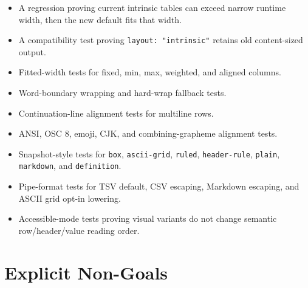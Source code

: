 \begin{itemize}
\tightlist
\item
  A regression proving current intrinsic tables can exceed narrow runtime width, then the new default fits that width.
\item
  A compatibility test proving \texttt{l\allowbreak{}a\allowbreak{}y\allowbreak{}o\allowbreak{}u\allowbreak{}t\allowbreak{}:\allowbreak{} \allowbreak{}"\allowbreak{}i\allowbreak{}n\allowbreak{}t\allowbreak{}r\allowbreak{}i\allowbreak{}n\allowbreak{}s\allowbreak{}i\allowbreak{}c\allowbreak{}"} retains old content-sized output.
\item
  Fitted-width tests for fixed, min, max, weighted, and aligned columns.
\item
  Word-boundary wrapping and hard-wrap fallback tests.
\item
  Continuation-line alignment tests for multiline rows.
\item
  ANSI, OSC 8, emoji, CJK, and combining-grapheme alignment tests.
\item
  Snapshot-style tests for \texttt{b\allowbreak{}o\allowbreak{}x}, \texttt{a\allowbreak{}s\allowbreak{}c\allowbreak{}i\allowbreak{}i\allowbreak{}-\allowbreak{}g\allowbreak{}r\allowbreak{}i\allowbreak{}d}, \texttt{r\allowbreak{}u\allowbreak{}l\allowbreak{}e\allowbreak{}d}, \texttt{h\allowbreak{}e\allowbreak{}a\allowbreak{}d\allowbreak{}e\allowbreak{}r\allowbreak{}-\allowbreak{}r\allowbreak{}u\allowbreak{}l\allowbreak{}e}, \texttt{p\allowbreak{}l\allowbreak{}a\allowbreak{}i\allowbreak{}n}, \texttt{m\allowbreak{}a\allowbreak{}r\allowbreak{}k\allowbreak{}d\allowbreak{}o\allowbreak{}w\allowbreak{}n}, and \texttt{d\allowbreak{}e\allowbreak{}f\allowbreak{}i\allowbreak{}n\allowbreak{}i\allowbreak{}t\allowbreak{}i\allowbreak{}o\allowbreak{}n}.
\item
  Pipe-format tests for TSV default, CSV escaping, Markdown escaping, and ASCII grid opt-in lowering.
\item
  Accessible-mode tests proving visual variants do not change semantic row/header/value reading order.
\end{itemize}

\section{Explicit Non-Goals}\label{record-133-explicit-non-goals}

